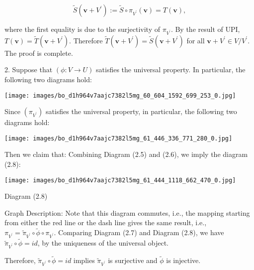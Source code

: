 \documentclass[11pt]{article}
\begin{document}
\[
\widetilde{S}\left( {\mathbf{v} + {V}^{\prime }}\right)  \mathrel{\text{ := }} \widetilde{S} \circ  {\pi }_{{V}^{\prime }}\left( \mathbf{v}\right)  = T\left( \mathbf{v}\right) ,
\]

where the first equality is due to the surjectivity of \({\pi }_{{V}^{\prime }}\). By the result of UPI, \(T\left( \mathbf{v}\right)  = \widetilde{T}\left( {\mathbf{v} + {V}^{\prime }}\right)\). Therefore \(\widetilde{T}\left( {\mathbf{v} + {V}^{\prime }}\right)  = \widetilde{S}\left( {\mathbf{v} + {V}^{\prime }}\right)\) for all \(\mathbf{v} + {V}^{\prime } \in  V/{V}^{\prime }\). The proof is complete.

2. Suppose that \(\left( {\phi  : V \rightarrow  U}\right)\) satisfies the universal property. In particular, the following two diagrams hold:

\begin{center}
\texttt{[image: images/bo\_d1h964v7aajc7382l5mg\_60\_604\_1592\_699\_253\_0.jpg]}
\end{center}
\hspace*{3em} 

Since \(\left( {\pi }_{{V}^{\prime }}\right)\) satisfies the universal property, in particular, the following two diagrams hold:

\begin{center}
\texttt{[image: images/bo\_d1h964v7aajc7382l5mg\_61\_446\_336\_771\_280\_0.jpg]}
\end{center}
\hspace*{3em} 

Then we claim that: Combining Diagram (2.5) and (2.6), we imply the diagram (2.8):

\begin{center}
\texttt{[image: images/bo\_d1h964v7aajc7382l5mg\_61\_444\_1118\_662\_470\_0.jpg]}
\end{center}
\hspace*{3em} 

Diagram (2.8)

Graph Description: Note that this diagram commutes, i.e., the mapping starting from either the red line or the dash line gives the same result, i.e., \({\pi }_{{V}^{\prime }} = {\widetilde{\pi }}_{{V}^{\prime }} \circ  \widetilde{\phi } \circ  {\pi }_{{V}^{\prime }}\). Comparing Diagram (2.7) and Diagram (2.8), we have \({\widetilde{\pi }}_{{V}^{\prime }} \circ  \widetilde{\phi } = {id}\), by the uniqueness of the universal object.

Therefore, \({\widetilde{\pi }}_{{V}^{\prime }} \circ  \widetilde{\phi } = {id}\) implies \({\widetilde{\pi }}_{{V}^{\prime }}\) is surjective and \(\widetilde{\phi }\) is injective.
\end{document}
